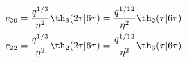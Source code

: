 \begin{equation}
  \begin{split}
c_{20} &= {q^{1/3}\over \eta^2} \th_3(2\tau|{6\tau}) 
       ={q^{1/12}\over \eta^2} \th_2(\tau|{6\tau})\\
c_{22} &= {q^{1/3}\over \eta^2} \th_2(2\tau|{6\tau}) 
       ={q^{1/12}\over \eta^2} \th_3(\tau|{6\tau}).
  \end{split}
\end{equation}

